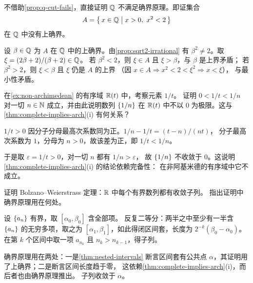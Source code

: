 \begin{exercise}[结构]
  \label{exr:q-not-complete}
  不借助\cref{prop:q-cut-fails}，直接证明 \(\mathbb{Q}\) 不满足确界原理。即证集合
  \[
    A = \left\{\,x \in \mathbb{Q} \;\middle|\; x > 0,\ x^{2} < 2\,\right\}
  \]
  在 \(\mathbb{Q}\) 中没有上确界。
  \begin{solution}
    设 \(\beta \in \mathbb{Q}\) 为 \(A\) 在 \(\mathbb{Q}\) 中的上确界。由\cref{prop:sqrt2-irrational}
    有 \(\beta^{2} \neq 2\)。取 \(\xi = (2\beta+2)/(\beta+2) \in \mathbb{Q}\)。
    若 \(\beta^{2} < 2\)，则 \(\xi \in A\) 且 \(\xi > \beta\)，与 \(\beta\) 是上界矛盾；
    若 \(\beta^{2} > 2\)，则 \(\xi < \beta\) 且 \(\xi\) 仍是 \(A\) 的上界
    （因 \(x \in A \Rightarrow x^{2} < 2 < \xi^{2} \Rightarrow x < \xi\)），
    与最小性矛盾。
  \end{solution}
\end{exercise}

\begin{exercise}[结构]
  \label{exr:archimedean-fails}
  在\cref{ex:non-archimedean} 的有序域 \(\mathbb{R}(t)\) 中，考察元素 \(1/t\)。
  证明 \(0 < 1/t < 1/n\) 对一切 \(n \in \mathbb{N}\) 成立，并由此说明数列
  \(\{1/n\}\) 在 \(\mathbb{R}(t)\) 中不以 \(0\) 为极限。这与%
  \cref{thm:complete-implies-arch}(i) 有何关系？
  \begin{solution}
    \(1/t > 0\) 因分子分母最高次系数同为正。\(1/n - 1/t = (t - n)/(nt)\)，
    分子最高次系数为 \(1\)，分母为 \(n > 0\)，故该差为正，即 \(1/t < 1/n\)。

    于是取 \(\varepsilon = 1/t > 0\)，对一切 \(n\) 都有 \(1/n > \varepsilon\)，
    故 \(\{1/n\}\) 不收敛于 \(0\)。这说明%
    \cref{thm:complete-implies-arch}(i) 的结论依赖完备性：
    在非阿基米德的有序域中它不成立。
  \end{solution}
\end{exercise}

\begin{exercise}[结构]
  \label{exr:bw}
  证明 Bolzano--Weierstrass 定理：\(\mathbb{R}\) 中每个有界数列都有收敛子列。
  指出证明中确界原理用在何处。
  \begin{solution}
    设 \(\{a_{n}\}\) 有界，取 \([\alpha_{0}, \beta_{0}]\) 含全部项。
    反复二等分：两半之中至少有一半含 \(\{a_{n}\}\) 的无穷多项，取之为
    \([\alpha_{1}, \beta_{1}]\)，如此得闭区间套，长度为 \(2^{-k}(\beta_{0}-\alpha_{0})\)。
    在第 \(k\) 个区间中取一项 \(a_{n_{k}}\) 且 \(n_{k} > n_{k-1}\)，得子列。

    确界原理用在两处：一是\cref{thm:nested-intervals} 断言区间套有公共点
    \(\alpha\)，其证明用了上确界；二是断言区间长度趋于零，
    这依赖\cref{thm:complete-implies-arch}(i)，而后者也由确界原理推出。
    子列收敛于 \(\alpha\)。
  \end{solution}
\end{exercise}

